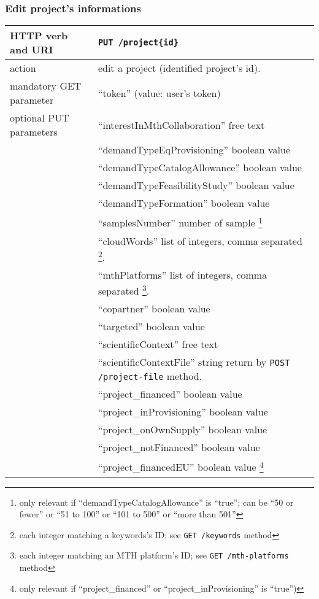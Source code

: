 \subsubsection{Edit project's informations}
\label{putprojects}
\begin{tabular}{ | l | l | }
	\hline
	HTTP verb and URI & \texttt{PUT /project\{id\}} \\
	\hline
	action & edit a project (identified \via project's id). \\
	\hline
	mandatory GET parameter & ``token'' (value: user's token) \\
	\hline
	optional PUT parameters & ``interestInMthCollaboration'' free text \\		
	\space & ``demandTypeEqProvisioning'' boolean value \\
	\space & ``demandTypeCatalogAllowance'' boolean value \\
	\space & ``demandTypeFeasibilityStudy'' boolean value \\
	\space & ``demandTypeFormation'' boolean value \\
	\space & ``samplesNumber'' number of sample \footnote{only relevant if ``demandTypeCatalogAllowance'' is ``true''; can be ``50 or fewer'' or ``51 to 100'' or ``101 to 500'' or ``more than 501'' } \\
	\space & ``cloudWords'' list of integers, comma separated \footnote{each integer matching a keywords’s ID; see \texttt{GET /keywords} method}. \\
	\space & ``mthPlatforms'' list of integers, comma separated \footnote{each integer matching an MTH platform’s ID; see \texttt{GET /mth-platforms} method}. \\
	\space & ``copartner'' boolean value \\
	\space & ``targeted'' boolean value \\
	\space & ``scientificContext'' free text \\	
	\space & ``scientificContextFile'' string return by \texttt{POST /project-file} method. \\
	\space & ``project\_financed'' boolean value  \\
	\space & ``project\_inProvisioning'' boolean value \\
	\space & ``project\_onOwnSupply'' boolean value \\
	\space & ``project\_notFinanced'' boolean value \\
	\space & ``project\_financedEU'' boolean value \footnote{only relevant if ``project\_financed'' or ``project\_inProvisioning'' is ``true'')} \\

\end{tabular}
